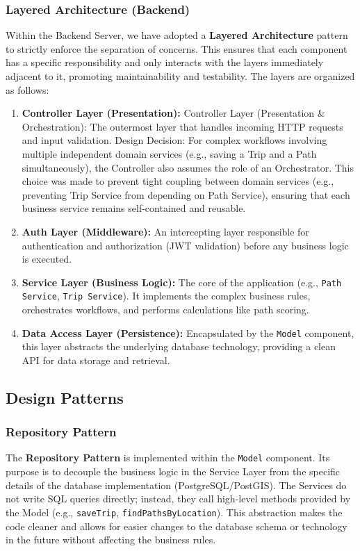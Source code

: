 \subsubsection{Layered Architecture (Backend)}
Within the Backend Server, we have adopted a \textbf{Layered Architecture} pattern to strictly enforce the separation of concerns. This ensures that each component has a specific responsibility and only interacts with the layers immediately adjacent to it, promoting maintainability and testability. The layers are organized as follows:
\begin{enumerate}
    \item \textbf{Controller Layer (Presentation):} Controller Layer (Presentation \& Orchestration): The outermost layer that handles incoming HTTP requests and input validation. Design Decision: For complex workflows involving multiple independent domain services (e.g., saving a Trip and a Path simultaneously), the Controller also assumes the role of an Orchestrator. This choice was made to prevent tight coupling between domain services (e.g., preventing Trip Service from depending on Path Service), ensuring that each business service remains self-contained and reusable.
    
    \item \textbf{Auth Layer (Middleware):} An intercepting layer responsible for authentication and authorization (JWT validation) before any business logic is executed.
    \item \textbf{Service Layer (Business Logic):} The core of the application (e.g., \texttt{Path Service}, \texttt{Trip Service}). It implements the complex business rules, orchestrates workflows, and performs calculations like path scoring.
    \item \textbf{Data Access Layer (Persistence):} Encapsulated by the \texttt{Model} component, this layer abstracts the underlying database technology, providing a clean API for data storage and retrieval.
\end{enumerate}

\subsection{Design Patterns}

\subsubsection{Repository Pattern}
The \textbf{Repository Pattern} is implemented within the \texttt{Model} component. Its purpose is to decouple the business logic in the Service Layer from the specific details of the database implementation (PostgreSQL/PostGIS). The Services do not write SQL queries directly; instead, they call high-level methods provided by the Model (e.g., \texttt{saveTrip}, \texttt{findPathsByLocation}). This abstraction makes the code cleaner and allows for easier changes to the database schema or technology in the future without affecting the business rules.

